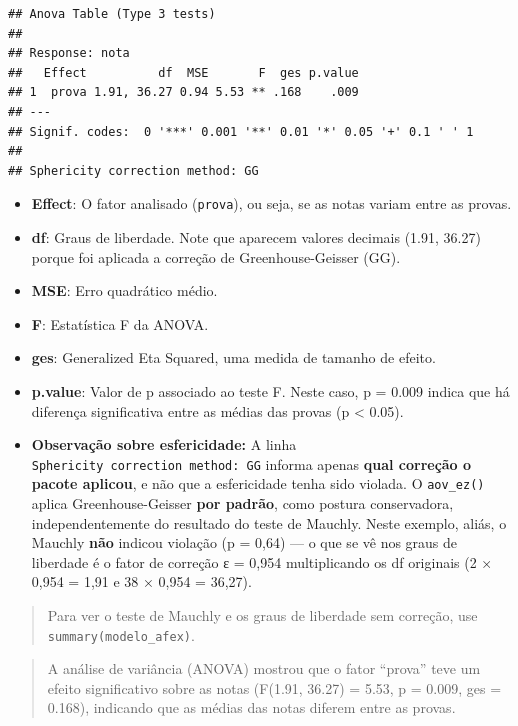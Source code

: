 \documentclass[
]{book}
\providecommand{\tightlist}{%
  \setlength{\itemsep}{0pt}\setlength{\parskip}{0pt}}
\begin{document}
\begin{verbatim}
## Anova Table (Type 3 tests)
## 
## Response: nota
##   Effect          df  MSE       F  ges p.value
## 1  prova 1.91, 36.27 0.94 5.53 ** .168    .009
## ---
## Signif. codes:  0 '***' 0.001 '**' 0.01 '*' 0.05 '+' 0.1 ' ' 1
## 
## Sphericity correction method: GG
\end{verbatim}

\begin{itemize}
\tightlist
\item
  \textbf{Effect}: O fator analisado (\texttt{prova}), ou seja, se as notas variam entre as provas.
\item
  \textbf{df}: Graus de liberdade. Note que aparecem valores decimais (1.91, 36.27) porque foi aplicada a correção de Greenhouse-Geisser (GG).
\item
  \textbf{MSE}: Erro quadrático médio.
\item
  \textbf{F}: Estatística F da ANOVA.
\item
  \textbf{ges}: Generalized Eta Squared, uma medida de tamanho de efeito.
\item
  \textbf{p.value}: Valor de p associado ao teste F. Neste caso, p = 0.009 indica que há diferença significativa entre as médias das provas (p \textless{} 0.05).
\item
  \textbf{Observação sobre esfericidade:} A linha \texttt{Sphericity\ correction\ method:\ GG} informa apenas \textbf{qual correção o pacote aplicou}, e não que a esfericidade tenha sido violada. O \texttt{aov\_ez()} aplica Greenhouse-Geisser \textbf{por padrão}, como postura conservadora, independentemente do resultado do teste de Mauchly. Neste exemplo, aliás, o Mauchly \textbf{não} indicou violação (p = 0,64) --- o que se vê nos graus de liberdade é o fator de correção ε = 0,954 multiplicando os df originais (2 × 0,954 = 1,91 e 38 × 0,954 = 36,27).
\end{itemize}

\begin{quote}
Para ver o teste de Mauchly e os graus de liberdade sem correção, use \texttt{summary(modelo\_afex)}.
\end{quote}

\begin{quote}
A análise de variância (ANOVA) mostrou que o fator ``prova'' teve um efeito significativo sobre as notas (F(1.91, 36.27) = 5.53, p = 0.009, ges = 0.168), indicando que as médias das notas diferem entre as provas.
\end{quote}
\end{document}
